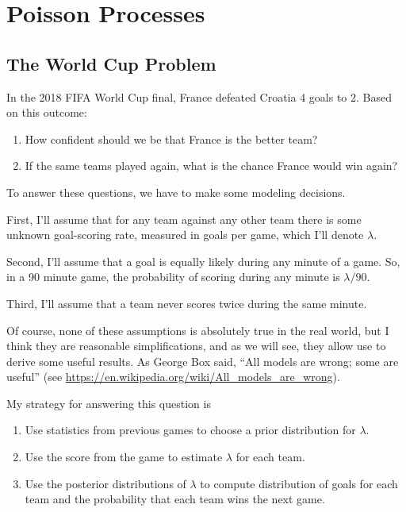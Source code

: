 \documentclass[12pt]{book}
\theoremstyle{exercise}
\begin{document}
\chapter{Poisson Processes}
\label{prediction}

\newcommand{\lam}{\mathtt{\lambda}}

\section{The World Cup Problem}

In the 2018 FIFA World Cup final, France defeated Croatia 4 goals to 2.  Based on this outcome:

\begin{enumerate}

\item How confident should we be that France is the better team?

\item If the same teams played again, what is the chance France would win again?

\end{enumerate}


To answer these questions, we have to make some modeling decisions.

First, I'll assume that for any team against any other team there is some unknown goal-scoring rate, measured in goals per game, which I'll denote 
$\lam$.

Second, I'll assume that a goal is equally likely during any minute of a game.  So, in a 90 minute game, the probability of scoring during any minute is $\lam / 90$.

Third, I'll assume that a team never scores twice during the same minute.

Of course, none of these assumptions is absolutely true in the real world, but I think they are reasonable simplifications, and as we will see, they allow use to derive some useful results.
As George Box said, ``All models are wrong; some are useful''
(see \url{https://en.wikipedia.org/wiki/All_models_are_wrong}).

My strategy for answering this question is

\begin{enumerate}

\item Use statistics from previous games to choose a prior
distribution for $\lam$.

\item Use the score from the game to estimate $\lam$ for each team.

\item Use the posterior distributions of $\lam$ to compute 
distribution of goals for each team and the probability that each team wins
the next game.

\end{enumerate}
\end{document}

